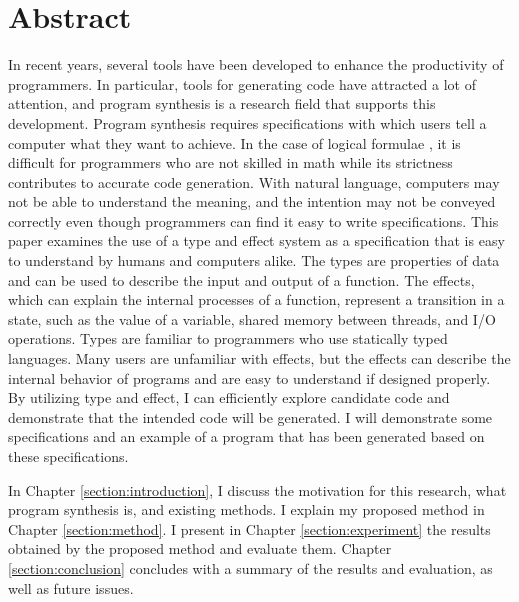 \documentclass[12pt, a4paper, titlepage]{report}
\begin{document}
\chapter{Abstract} \label{section:abstract}
In recent years, several tools have been developed to enhance the productivity of programmers.
In particular, tools for generating code have attracted a lot of attention, and program synthesis is a research field that supports this development.
Program synthesis requires specifications with which users tell a computer what they want to achieve.
In the case of logical formulae  , it is
difficult for programmers who are not skilled in math while its strictness contributes to accurate code generation. 
With natural language, computers may not be able to understand the meaning, and the intention may not be conveyed correctly even though programmers can find it easy to write specifications. 
This paper examines the use of a type and effect system as a specification that is easy to understand by  humans and computers alike. The types are properties of data and can be used to describe the input and output of a function. The effects, which can explain the internal processes of a function, represent a transition in a state, such as the value of a variable, shared memory between threads, and I/O operations.
Types are familiar to programmers who use statically typed languages.
Many users are unfamiliar with effects, but the effects  can describe the internal behavior of programs  and are easy to understand if designed properly.
By utilizing type and effect, I can efficiently explore candidate code and demonstrate that the intended code will be generated. I will demonstrate some specifications and an example of a program that has been generated based on these specifications.

In Chapter \ref{section:introduction}, I discuss the motivation for this research, what program synthesis is, and existing methods.
I explain my proposed method in Chapter \ref{section:method}.
I present in Chapter \ref{section:experiment} the results obtained by the proposed method and evaluate them.
Chapter \ref{section:conclusion} concludes with a summary of the results and evaluation, as well as future issues.
\end{document}

